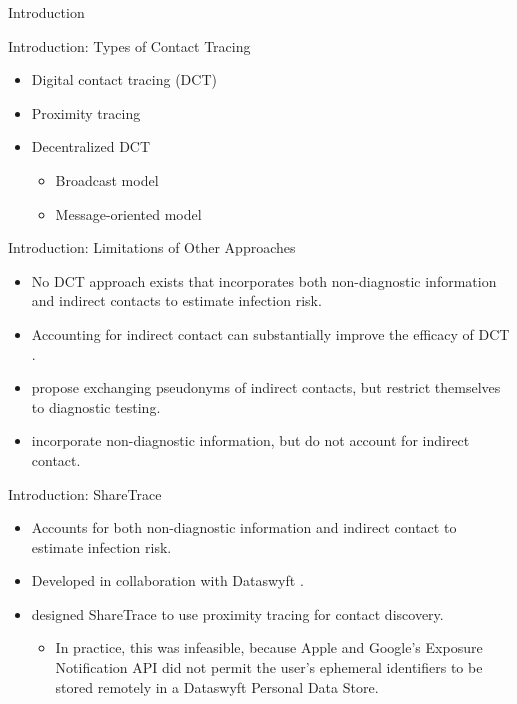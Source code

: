 \documentclass[11pt]{beamer}
\begin{document}
\begin{frame}
	\maketitle
\end{frame}

\begin{section}{Introduction}

\begin{frame}{Introduction: Types of Contact Tracing}
\begin{itemize}
  \item Digital contact tracing (DCT)
  \item Proximity tracing
  \item Decentralized DCT
    \begin{itemize}
      \item Broadcast model
      \item Message-oriented model
    \end{itemize}
\end{itemize}
\end{frame}

\begin{frame}{Introduction: Limitations of Other Approaches}
\begin{itemize}
  \item No DCT approach exists that incorporates both non-diagnostic information and indirect contacts to estimate infection risk.
  \item Accounting for indirect contact can substantially improve the efficacy of DCT \citep{PozoMartin2023}.
  \item \citet{Cherini2023} propose exchanging pseudonyms of indirect contacts, but restrict themselves to diagnostic testing.
  \item \citet{Gupta2023} incorporate non-diagnostic information, but do not account for indirect contact.
\end{itemize}
\end{frame}

\begin{frame}{Introduction: ShareTrace}
\begin{itemize}
  \item Accounts for both non-diagnostic information and indirect contact to estimate infection risk.
  \item Developed in collaboration with Dataswyft \citep{Ayday2020}. 
  \item \citet{Ayday2021} designed ShareTrace to use proximity tracing for contact discovery.
    \begin{itemize}
      \item In practice, this was infeasible, because Apple and Google's Exposure Notification API did not permit the user's ephemeral identifiers to be stored remotely in a Dataswyft Personal Data Store.
    \end{itemize}
\end{itemize}
\end{frame}


\end{section}
\end{document}

